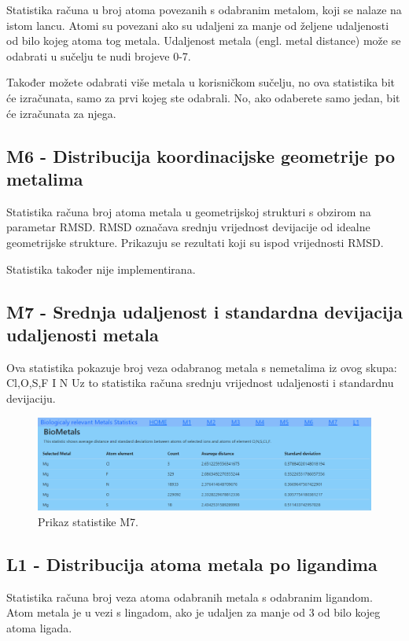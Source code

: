 \documentclass[times, utf8, zavrsni]{fer}
\begin{document}
Statistika računa u broj atoma povezanih s odabranim metalom, koji se nalaze na istom lancu.
Atomi su povezani ako su udaljeni za manje od željene udaljenosti od bilo kojeg atoma tog metala. 
Udaljenost metala (engl. metal distance) može se odabrati u sučelju te nudi brojeve 0-7.

Također možete odabrati više metala u korisničkom sučelju, no ova statistika bit će izračunata, samo za prvi kojeg ste odabrali.
No, ako odaberete samo jedan, bit će izračunata za njega.


\subsection{M6 - Distribucija koordinacijske geometrije po metalima}
Statistika računa broj atoma metala u geometrijskoj strukturi s obzirom na parametar RMSD. RMSD označava srednju vrijednost devijacije od idealne geometrijske
strukture. Prikazuju se rezultati koji su ispod vrijednosti RMSD.

Statistika također nije implementirana.


\subsection{M7 - Srednja udaljenost i standardna devijacija udaljenosti metala}
Ova statistika pokazuje broj veza odabranog metala s nemetalima iz ovog skupa: Cl,O,S,F I N
Uz to statistika računa srednju vrijednost udaljenosti i standardnu devijaciju.

\begin{figure}[!htb]
	\centering
	\hspace*{-2.5cm}
	 \includegraphics[width=\dimexpr\paperwidth-2cm,height=\paperheight,keepaspectratio]
	{./img/M7.png}
		\centering
                      \caption{Prikaz statistike M7.}
    \end{figure}

\subsection{L1 - Distribucija atoma metala po ligandima}
Statistika računa broj veza atoma  odabranih metala s odabranim ligandom.
Atom metala je u vezi s lingadom, ako je udaljen za manje od 3 od bilo kojeg atoma ligada.
\end{document}
